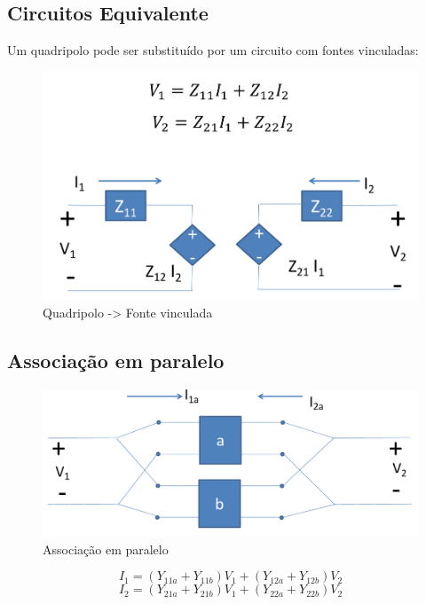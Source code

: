 \documentclass[a4paper, 12pt]{article}
\begin{document}
	\newpage
	\subsection{Circuitos Equivalente}
		Um quadripolo pode ser substituído por um circuito com fontes vinculadas:
		\begin{figure}[h]
			\centering
			\includegraphics[scale=0.4]{a9.png}
			\caption{Quadripolo -> Fonte vinculada}
		\end{figure}
		
	\subsection{Associação em paralelo}
		\begin{figure}[h]
			\centering
			\includegraphics[scale=0.4]{a10.png}
			\caption{Associação em paralelo}
		\end{figure}
		\begin{equation}
			I_1 = (Y_{11a} + Y_{11b})V_1 + (Y_{12a} + Y_{12b})V_2
		\end{equation}
		\begin{equation}
			I_2 = (Y_{21a} + Y_{21b})V_1 + (Y_{22a} + Y_{22b})V_2
		\end{equation}
		
\end{document}

